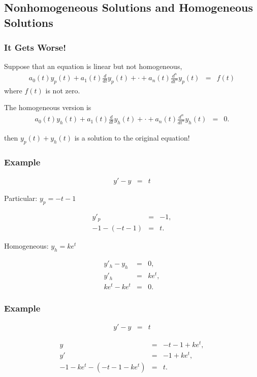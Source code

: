 \subsection{Nonhomogeneous Solutions and Homogeneous Solutions}


\begin{frame}
  \frametitle{It Gets Worse!}

  Suppose that an equation is linear but not homogeneous,
  \begin{eqnarray*}
    a_0(t) y_p(t) + a_1(t) \frac{d}{dt} y_p(t) + \cdot + a_n(t) \frac{d^n}{dt^n} y_p(t) & = & f(t)
  \end{eqnarray*}
  where $f(t)$ is not zero.

  The homogeneous version is 
  \begin{eqnarray*}
    a_0(t) y_h(t) + a_1(t) \frac{d}{dt} y_h(t) + \cdot + a_n(t) \frac{d^n}{dt^n} y_h(t) & = & 0.
  \end{eqnarray*}

  then $y_p(t)+y_h(t)$ is a solution to the original equation!


\end{frame}


\begin{frame}
  \frametitle{Example}

  \begin{eqnarray*}
    y' - y & = & t
  \end{eqnarray*}

  Particular: $y_p = -t-1$

  \begin{eqnarray*}
    y'_p & = & -1, \\
    -1 - (-t -1) & = & t.
  \end{eqnarray*}

  Homogeneous: $y_h = k e^t$

  \begin{eqnarray*}
    y'_h - y_h & = & 0, \\
    y'_h & = & k e^t, \\
    k e^t - k e^t & = & 0.
  \end{eqnarray*}

\end{frame}

\begin{frame}
  \frametitle{Example}

  \begin{eqnarray*}
    y' - y & = & t
  \end{eqnarray*}

  \begin{eqnarray*}
    y & = & -t - 1 + ke^t, \\
    y' & = & -1 + ke^t, \\
    -1-ke^t - (-t-1-ke^t) & = & t.
  \end{eqnarray*}

\end{frame}



